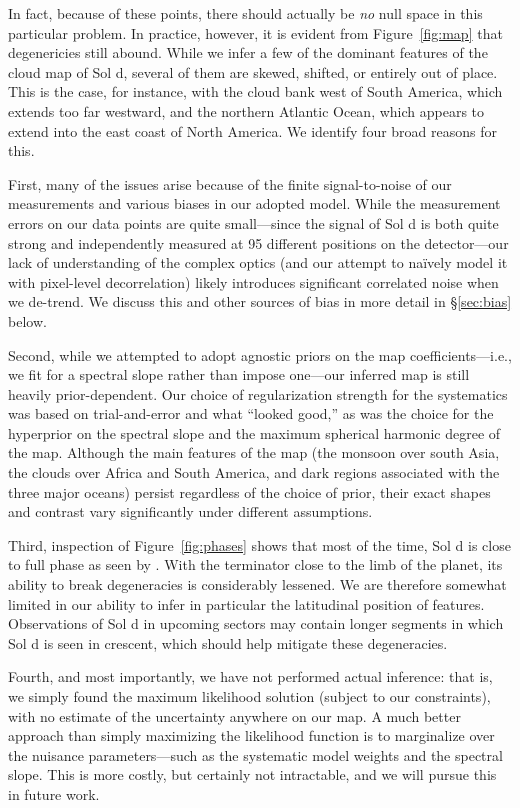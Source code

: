 \documentclass[modern]{aastex62}
\begin{document}
In fact, because of these points, there should actually be \emph{no} null space 
in this particular problem. In practice, however, it is evident from
Figure~\ref{fig:map} that degenericies still abound. While we infer a few of the
dominant features of the cloud map of Sol d, several of them are skewed, 
shifted, or entirely out of place. This is the case, for instance, with
the cloud bank west of South America, which extends too far westward, and
the northern Atlantic Ocean, which appears to extend into the east coast of
North America. We identify four broad reasons for this.

First, many of the issues arise because
of the finite signal-to-noise of our measurements and various biases in
our adopted model. While the measurement errors on our data points are
quite small---since the signal of Sol d is both quite strong and independently
measured at 95 different positions on the detector---our lack of understanding
of the complex optics (and our
attempt to na{\"i}vely model it with pixel-level decorrelation) likely
introduces significant correlated noise when we de-trend. We discuss this
and other sources of bias in more detail in \S\ref{sec:bias} below.

Second, while we attempted to adopt agnostic priors on the map coefficients---i.e.,
we fit for a spectral slope rather than impose one---our inferred map is still 
heavily prior-dependent. Our choice of regularization strength for the systematics
was based on trial-and-error and what ``looked good,'' as was the choice for the 
hyperprior on the spectral
slope and the maximum spherical harmonic degree of the map. Although the main
features of the map (the monsoon over south Asia, the clouds over Africa and
South America, and dark regions associated with the three major oceans) persist
regardless of the choice of prior, their exact shapes and contrast vary
significantly under different assumptions.

Third, inspection of Figure~\ref{fig:phases} shows that most of the time, Sol
d is close to full phase as seen by \TESS.
With the terminator close to the limb
of the planet, its ability to break degeneracies is considerably lessened.
We are therefore somewhat limited in our ability to infer in particular the
latitudinal position of features. Observations of Sol d in upcoming
sectors may contain longer segments in which Sol d is seen in crescent,
which should help mitigate these degeneracies.

Fourth, and most importantly, we have not performed actual inference: that is, 
we simply found the maximum likelihood solution (subject to our constraints),
with no estimate of the uncertainty anywhere on our map. A much better
approach than simply maximizing the likelihood function is to marginalize
over the nuisance parameters---such as the systematic model weights and the spectral
slope. This is more costly, but certainly not intractable, and we will
pursue this in future work.
\end{document}
